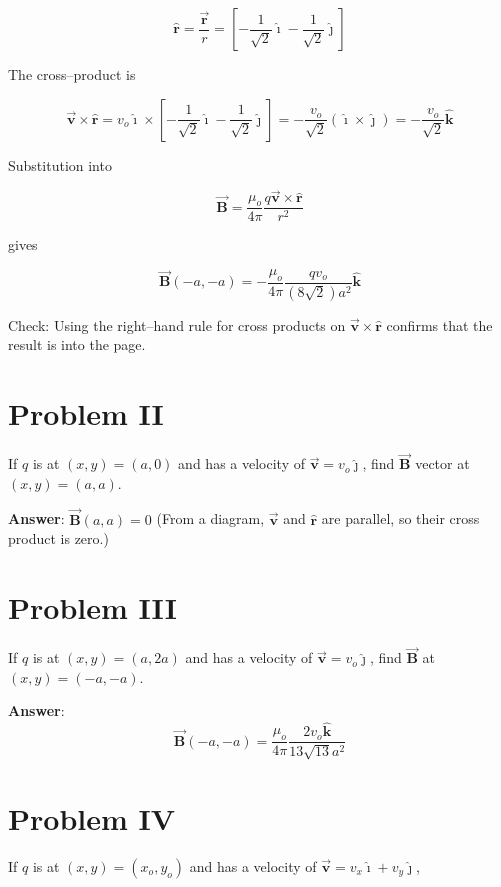 \documentclass{article}
\newcommand{\ihat}[0]{\hat{\boldsymbol{\imath}}}
\newcommand{\jhat}[0]{\hat{\boldsymbol{\jmath}}}
\newcommand{\khat}[0]{\hat{\boldsymbol{k}}}
\newcommand{\bfvec}[1]{\vec{\mathbf{#1}}}
\begin{document}
$$\hat{\mathbf{r}}=\frac{\bfvec{r}}{r} = \left[-\frac{1}{\sqrt{2}}\ihat - \frac{1}{\sqrt{2}}\jhat\right]$$

The cross--product is

$$\bfvec{v}\times\hat{\mathbf{r}}=v_o\ihat\times\left[-\frac{1}{\sqrt{2}}\ihat - \frac{1}{\sqrt{2}}\jhat\right] = -\frac{v_o}{\sqrt{2}}(\ihat\times\jhat) = -\frac{v_o}{\sqrt{2}}\khat$$

Substitution into 

$$\bfvec{B} = \frac{\mu_o}{4\pi}\frac{q\bfvec{v}\times\hat{\mathbf{r}}}{r^2}$$

gives

$$\bfvec{B}(-a,-a) = -\frac{\mu_o}{4\pi} \frac{qv_o}{(8\sqrt{2})a^2}\khat$$

Check: Using the right--hand rule for cross products on $\bfvec{v}\times\hat{\mathbf{r}}$ confirms that the result is into the page.
\else
\vskip 288pt
\fi

\section{Problem II}

If $q$ is at $(x,y)=(a,0)$ and has a velocity of $\bfvec{v}=v_o\jhat$, find $\bfvec{B}$ vector at $(x,y)=(a,a)$.

\ifsolutions
\textbf{Answer}: $\bfvec{B}(a,a)=0$ (From a diagram, $\bfvec{v}$ and $\hat{\mathbf{r}}$ are parallel, so their cross product is zero.)
\else
\vskip 144pt
\fi

\ifsolutions

\else

\newpage
\fi

\section{Problem III}

If $q$ is at $(x,y)=(a,2a)$ and has a velocity of $\bfvec{v}=v_o\jhat$, find $\bfvec{B}$ at $(x,y)=(-a,-a)$.

\ifsolutions
\textbf{Answer}: 
$$\bfvec{B}(-a,-a)= \frac{\mu_o}{4\pi} \frac{2v_o\khat}{13\sqrt{13}a^2}$$
\else
\vskip 216pt
\fi

\section{Problem IV}

If $q$ is at $(x,y)=(x_o,y_o)$ and has a velocity of $\bfvec{v}=v_x\ihat+v_y\jhat$, 
\end{document}
